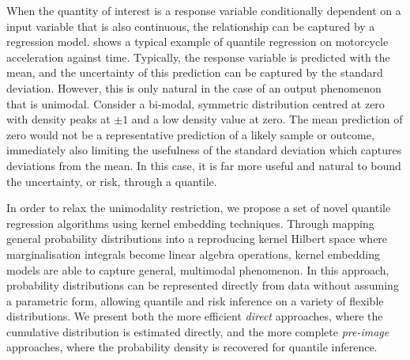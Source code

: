 \documentclass[twoside]{article} \usepackage{aistats2017}
\theoremstyle{definition}
\theoremstyle{theorem}
\begin{document}
%

	When the quantity of interest is a response variable conditionally dependent on a input variable that is also continuous, the relationship can be captured by a regression model.  shows a typical example of quantile regression on motorcycle acceleration against time. Typically, the response variable is predicted with the mean, and the uncertainty of this prediction can be captured by the standard deviation. However, this is only natural in the case of an output phenomenon that is unimodal. Consider a bi-modal, symmetric distribution centred at zero with density peaks at $\pm1$ and a low density value at zero. The mean prediction of zero would not be a representative prediction of a likely sample or outcome, immediately also limiting the usefulness of the standard deviation which captures deviations from the mean. In this case, it is far more useful and natural to bound the uncertainty, or risk, through a quantile.
	
%
	

	In order to relax the unimodality restriction, we propose a set of novel quantile regression algorithms using kernel embedding techniques. Through mapping general probability distributions into a reproducing kernel Hilbert space where marginalisation integrals become linear algebra operations, kernel embedding models are able to capture general, multimodal phenomenon. In this approach, probability distributions can be represented directly from data without assuming a parametric form, allowing quantile and risk inference on a variety of flexible distributions. We present both the more efficient \textit{direct} approaches, where the cumulative distribution is estimated directly, and the more complete \textit{pre-image} approaches, where the probability density is recovered for quantile inference.
\end{document}
